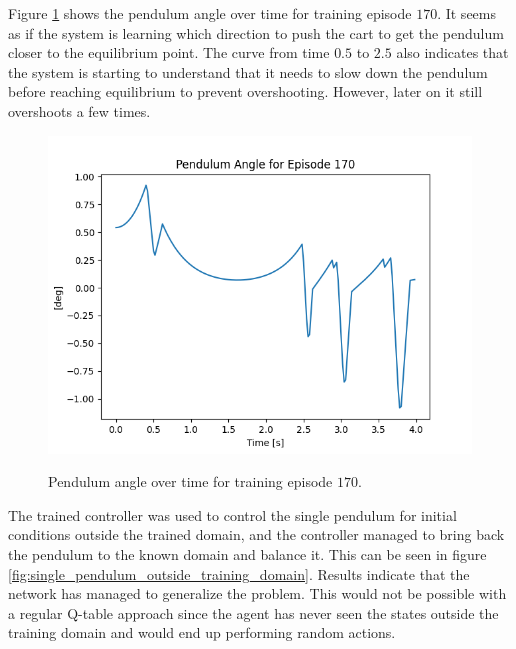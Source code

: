 \documentclass{LTHtwocol} %
\begin{document}
Figure \ref{fig:single_pendulum_angle} shows the pendulum angle over time for training episode $170$.
It seems as if the system is learning which direction to push the cart to get the pendulum closer to the equilibrium point.
The curve from time $0.5$ to $2.5$ also indicates that the system is starting to understand that it needs to slow down the pendulum before reaching equilibrium to prevent overshooting.
However, later on it still overshoots a few times.

\begin{figure}[H]
	\centering
	\includegraphics[width=0.9\columnwidth]{figures/Pendulum_angle.png}
	\label{fig:single_pendulum_angle}
	\caption{Pendulum angle over time for training episode $170$.}
\end{figure}

The trained controller was used to control the single pendulum for initial conditions outside the trained domain, and the controller managed to bring back the pendulum to the known domain and balance it.
This can be seen in figure \ref{fig:single_pendulum_outside_training_domain}.
Results indicate that the network has managed to generalize the problem.
This would not be possible with a regular Q-table approach since the agent has never seen the states outside the training domain and would end up performing random actions.
\end{document}
